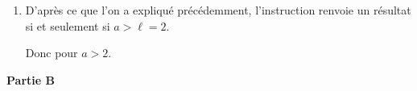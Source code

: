 \documentclass[10pt]{article}
\begin{document}
\begin{enumerate}
\begin{enumerate}
			La boucle \texttt{while} se termine donc après $N_0$ itérations, et \texttt{rang}(2.000001) renvoie la valeur $N_0$.

			Le seul risque que l'algorithme ne se termine pas avec un $a > 2$ serait que le réel $a$ soit trop proche de 2, et que les algorithmes utilisés par python donnent une valeur approchée trop peu précise des différents termes $u_n$ pour que la boucle se termine.

			\item D'après ce que l'on a expliqué précédemment, l'instruction renvoie un résultat si et seulement si $a > \ell = 2$.

			Donc pour $a > 2$.
		\end{enumerate}
	\end{enumerate}

	\bigskip

	\textbf{Partie B}

	\medskip
\end{document}
